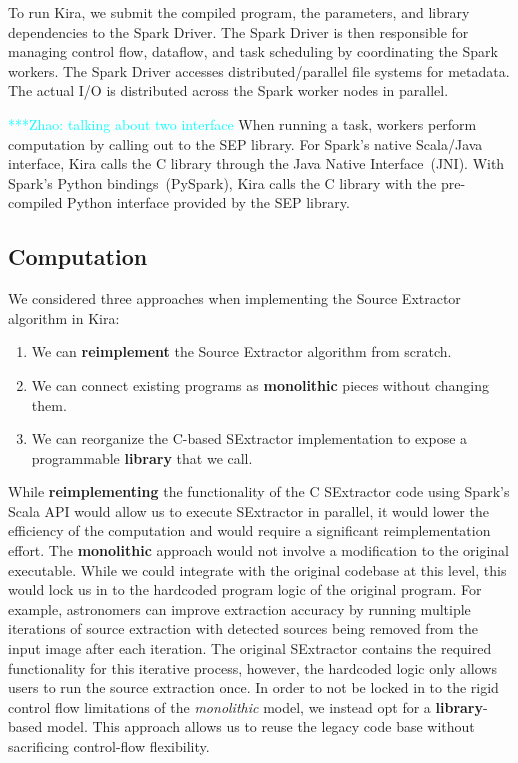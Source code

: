 \documentclass[10pt,journal,compsoc]{IEEEtran}
\newcommand{\zhaonote}[1]{{\textcolor{cyan}    { ***Zhao:      #1 }}}
\newcommand{\zhaonote}[1]{}
\begin{document}
To run Kira, we submit the compiled program, the parameters, and library dependencies to the Spark Driver.
The Spark Driver is then responsible for managing control flow, dataflow, and task scheduling 
by coordinating the Spark workers. 
The Spark Driver accesses distributed/parallel file systems for metadata.
The actual I/O is distributed across the Spark worker nodes in parallel. 

\zhaonote{talking about two interface}
When running a task, workers perform computation by calling out to the SEP library.
For Spark's native Scala/Java interface, Kira calls the C library through the Java Native Interface~(JNI).
With Spark's Python bindings~(PySpark), Kira calls the C library with the
pre-compiled Python interface provided by the SEP library. 

\subsection{Computation}
\label{sec:Design-Computation}
We considered three approaches when implementing the Source Extractor algorithm in Kira:

\begin{enumerate}
\item We can \textbf{reimplement} the Source Extractor algorithm from scratch.
\item We can connect existing programs as \textbf{monolithic} pieces without changing them.
\item We can reorganize the C-based SExtractor implementation to expose a programmable
\textbf{library} that we call.
\end{enumerate}

While \textbf{reimplementing} the functionality of the C SExtractor code using Spark's Scala API 
would allow us to execute SExtractor in parallel, it would lower the efficiency of the computation 
and would require a significant reimplementation effort.
The \textbf{monolithic} approach would not involve a modification to the original executable. While we could 
integrate with the original codebase at this level, this would lock us in to the hardcoded program logic 
of the original program. 
For example, astronomers can improve extraction accuracy by running multiple iterations of source
extraction with detected sources being removed from the input image after each iteration. 
The original SExtractor contains the required functionality for this iterative process, however, the hardcoded
logic only allows users to run the source extraction once.  
In order to not be locked in to the rigid control flow limitations of the \emph{monolithic} model, 
we instead opt for a \textbf{library}-based model.
This approach allows us to reuse the legacy code base without sacrificing control-flow flexibility.  
\end{document}
